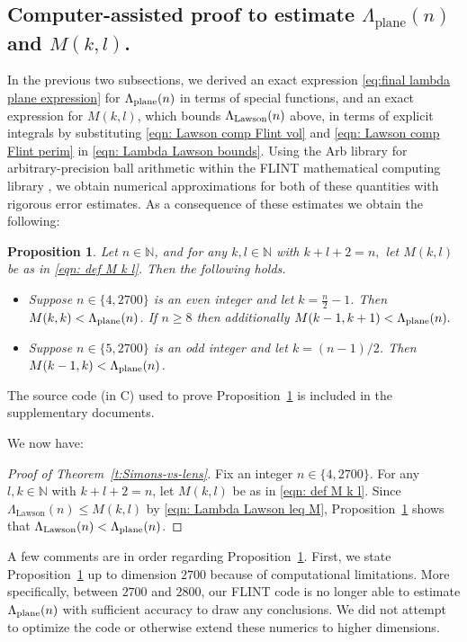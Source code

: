 \documentclass[10pt,reqno]{amsart}
\numberwithin{equation}{section}
\newtheorem{proposition}[theorem]{Proposition}
\theoremstyle{definition}
\DeclareMathOperator{\Lawson}{Lawson}
\DeclareMathOperator{\plane}{plane}
\begin{document}
{{\subsection{Computer-assisted proof to estimate $\Lambda_{\plane}(n)$ and $M(k,l)$.}\label{ssec: computerassisted}
In the previous two subsections, we derived an exact expression \eqref{eq:final lambda plane expression} for $\Lambda_{\rm plane}(n)$ in terms of special functions, and an exact expression for $M(k,l)$, which bounds $\Lambda_{\rm Lawson}(n)$ above,  in terms of explicit integrals  by substituting \eqref{eqn: Lawson comp Flint vol} and \eqref{eqn: Lawson comp Flint perim} in \eqref{eqn: Lambda Lawson bounds}. Using the Arb library for arbitrary-precision ball arithmetic \cite{Joh17} within the FLINT mathematical computing library \cite{flint}, we obtain numerical approximations for both of these quantities with rigorous error estimates. As a consequence of these estimates we obtain the following:
\begin{proposition}\label{prop: computer}
    Let $n \in \mathbb{N}$, and for any $k,l \in \mathbb{N}$ with $k+l+2=n,$ let $M(k,l)$ be as in \eqref{eqn: def M k l}. Then the following holds.
    \begin{itemize}
        \item Suppose $n \in \{4, 2700\}$  is an even integer and let $k=\frac{n}{2}-1$. Then $M(k,k) < \Lambda_{\rm plane}(n)$. If $n \geq 8$ then additionally $M(k-1, k+1) < \Lambda_{\rm plane}(n).$
        \item Suppose $n \in \{5, 2700\}$ is an odd integer and let $k = (n-1)/2$. Then $M(k-1,k) < \Lambda_{\rm plane}(n)$.
    \end{itemize}
\end{proposition}
The source code (in C) used to prove Proposition~\ref{prop: computer} is included in the supplementary documents.

We now have:
\begin{proof}[Proof of Theorem~\ref{t:Simons-vs-lens}]
  Fix an integer $n \in \{4, 2700\}$. For any $l,k \in \mathbb{N}$ with $k+l+2 = n$, let $M(k,l)$ be as in \eqref{eqn: def M k l}. Since $\Lambda_{\Lawson}(n) \leq M(k,l)$ by \eqref{eqn: Lambda Lawson leq M}, Proposition~\ref{prop: computer} shows that $\Lambda_{\rm Lawson}(n) < \Lambda_{\rm plane}(n)$.
\end{proof}

A few comments are in order regarding Proposition~\ref{prop: computer}. First, we state Proposition~\ref{prop: computer} up to dimension $2700$ because of computational limitations. More specifically, between $2700$ and $2800$, our FLINT code is no longer able to estimate $\Lambda_{\rm plane}(n)$ with sufficient accuracy to draw any conclusions. 
We did not attempt to optimize the code or otherwise extend these numerics to higher dimensions. 

}}
\end{document}
